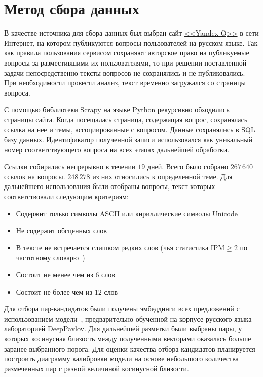 \documentclass[a4paper,14pt]{extarticle}
\begin{document}
\section{Метод сбора данных}

В качестве источника для сбора данных был выбран сайт \href{https://yandex.ru/q/}{<<Yandex Q>>} в сети Интернет, на котором публикуются вопросы пользователей на русском языке.
Так как правила пользования сервисом сохраняют авторское право на публикуемые вопросы за разместившими их пользователями, то при решении поставленной задачи непосредственно тексты вопросов не сохранялись и не публиковались. При необходимости провести анализ, текст временно загружался со страницы вопроса.

С помощью библиотеки Scrapy на языке Python рекурсивно обходились страницы сайта. Когда посещалась страница, содержащая вопрос, сохранялась ссылка на нее и темы, ассоциированные с вопросом.
Данные сохранялись в SQL базу данных. Идентификатор полученной записи использовался как уникальный номер соответствующего вопроса на всех этапах дальнейшей обработки.

Ссылки собирались непрерывно в течении $19$ дней. Всего было собрано $267\,640$ ссылок на вопросы. $248\,278$ из них относились к определенной теме.
Для дальнейшего использования были отобраны вопросы, текст которых соответствовали следующим критериям:
\begin{itemize}
    \item Содержит только символы ASCII или кириллические символы Unicode
    \item Не содержит обсценных слов
    \item В тексте не встречается слишком редких слов (чья статистика ${\mathrm{IPM} \ge 2}$ по частотному словарю~\autocite{ляшевская2009частотный})
    \item Состоит не менее чем из $6$ слов
    \item Состоит не более чем из $12$ слов
\end{itemize}

Для отбора пар-кандидатов были получены эмбеддинги всех предложений с использованием модели~\autocite{reimers2019sentence}, предварительно обученной на корпусе русского языка лабораторией DeepPavlov.
Для дальнейшей разметки были выбраны пары, у которых косинусная близость между полученными векторами оказалась больше заранее выбранного порога.
Для оценки качества отбора кандидатов планируется построить диаграмму калибровки модели на основе небольшого количества размеченных пар с разной величиной косинусной близости.
\end{document}
